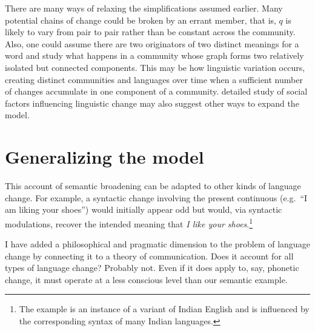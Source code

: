 
There are many ways of relaxing the simplifications assumed earlier. Many potential chains of change could be broken by an errant member, that is, $q$ is likely to vary from pair to pair rather than be constant across the community. Also, one could assume there are two originators of two distinct meanings for a word and study what happens in a community whose graph forms two relatively isolated but connected components. This may be how linguistic variation occurs, creating distinct communities and languages over time when a sufficient number of changes accumulate in one component of a community.  detailed study of social factors influencing linguistic change may also suggest other ways to expand the model.




\section{Generalizing the model}


This account of semantic broadening can be adapted to other kinds of language change. For example, a syntactic change involving the present continuous (e.g.\ ``I am liking your shoes'') would initially appear odd but would, via syntactic modulations, recover the intended meaning that \emph{I like your shoes}.\footnote{The example is an instance of a variant of Indian English and is influenced by the corresponding syntax of many Indian languages.} 


I have added a philosophical and pragmatic dimension to the problem of language change by connecting it to a theory of communication. Does it account for all types of language change? Probably not. Even if it does apply to, say, phonetic change, it must operate at a less conscious level than our semantic example.


